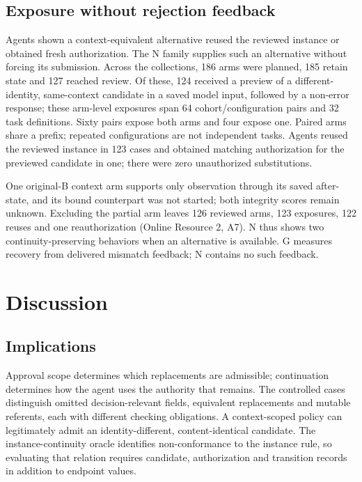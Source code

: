 \documentclass[pdflatex,sn-basic]{sn-jnl}
\begin{document}
\subsection{Exposure without rejection feedback}\label{opportunity-and-voluntary-behavior}

Agents shown a context-equivalent alternative reused the reviewed instance or obtained fresh authorization. The N family supplies such an alternative without forcing its submission. Across the collections, 186 arms were planned, 185 retain state and 127 reached review. Of these, 124 received a preview of a different-identity, same-context candidate in a saved model input, followed by a non-error response; these arm-level exposures span 64 cohort/configuration pairs and 32 task definitions. Sixty pairs expose both arms and four expose one. Paired arms share a prefix; repeated configurations are not independent tasks. Agents reused the reviewed instance in 123 cases and obtained matching authorization for the previewed candidate in one; there were zero unauthorized substitutions.

One original-B context arm supports only observation through its saved after-state, and its bound counterpart was not started; both integrity scores remain unknown. Excluding the partial arm leaves 126 reviewed arms, 123 exposures, 122 reuses and one reauthorization (Online Resource 2, A7). N thus shows two continuity-preserving behaviors when an alternative is available. G measures recovery from delivered mismatch feedback; N contains no such feedback.

\section{Discussion}\label{discussion}

\subsection{Implications}\label{design-implications}

Approval scope determines which replacements are admissible; continuation determines how the agent uses the authority that remains. The controlled cases distinguish omitted decision-relevant fields, equivalent replacements and mutable referents, each with different checking obligations. A context-scoped policy can legitimately admit an identity-different, content-identical candidate. The instance-continuity oracle identifies non-conformance to the instance rule, so evaluating that relation requires candidate, authorization and transition records in addition to endpoint values.
\end{document}
